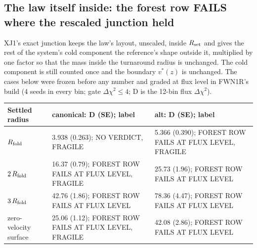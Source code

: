 \documentclass[10pt]{article}
\begin{document}
\subsection{The law itself inside: the forest row FAILS where the rescaled junction held}
XJ1's exact junction keeps the law's layout, unscaled, inside $R_{\rm set}$ and gives the rest of the system's cold component the reference's shape outside it, multiplied by one factor so that the mass inside the turnaround radius is unchanged. The cold component is still counted once and the boundary $v^*(z)$ is unchanged. The cases below were frozen before any number and graded at flux level in FWN1R's build (4 seeds in every bin; gate $\Delta\chi^2\le4$; D is the 12-bin flux $\Delta\chi^2$).
{\small
\begin{longtable}{@{}p{3.4cm}p{6.0cm}p{6.0cm}@{}}\toprule
Settled radius & canonical: D (SE); label & alt: D (SE); label\\\midrule\endhead
$R_{\rm fold}$ & 3.938 (0.263); NO VERDICT, FRAGILE & 5.366 (0.390); FOREST ROW FAILS AT FLUX LEVEL, FRAGILE\\
$2\,R_{\rm fold}$ & 16.37 (0.79); FOREST ROW FAILS AT FLUX LEVEL, FRAGILE & 25.73 (1.96); FOREST ROW FAILS AT FLUX LEVEL\\
$3\,R_{\rm fold}$ & 42.76 (1.86); FOREST ROW FAILS AT FLUX LEVEL & 78.36 (4.47); FOREST ROW FAILS AT FLUX LEVEL\\
zero-velocity surface & 25.06 (1.12); FOREST ROW FAILS AT FLUX LEVEL, FRAGILE & 42.08 (2.86); FOREST ROW FAILS AT FLUX LEVEL\\\bottomrule
\end{longtable}}
\end{document}
